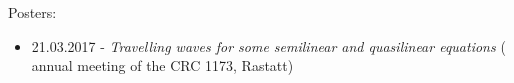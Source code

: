 \noindent Posters:
\begin{itemize}
  \item 21.03.2017 - \textsl{Travelling waves for some semilinear and quasilinear equations}  ( annual meeting of the CRC 1173, Rastatt)
\end{itemize}
